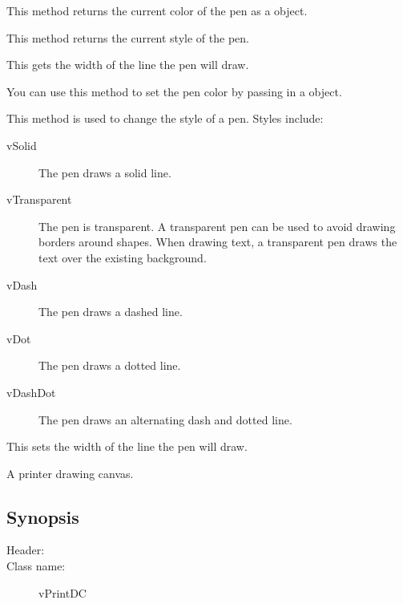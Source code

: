This method returns the current color of the pen as a  object.


This method returns the current style of the pen.


This gets the width of the line the pen will draw.


You can use this method to set the pen color by passing
in a  object.


This method is used to change the style of a pen. Styles include:

\begin{description}
	\item [vSolid] The pen draws a solid line.
	\item [vTransparent] The pen is transparent. A transparent
pen can be used to avoid drawing borders around shapes. When drawing
text, a transparent pen draws the text over the existing background.
	\item [vDash] The pen draws a dashed line.
	\item [vDot] The pen draws a dotted line.
	\item [vDashDot] The pen draws an alternating dash and dotted line.
\end{description}


This sets the width of the line the pen will draw.


A printer drawing canvas.

\subsection* {Synopsis}

\begin{description}
	\item [Header:] 
	\item [Class name:] vPrintDC
\end{description}

